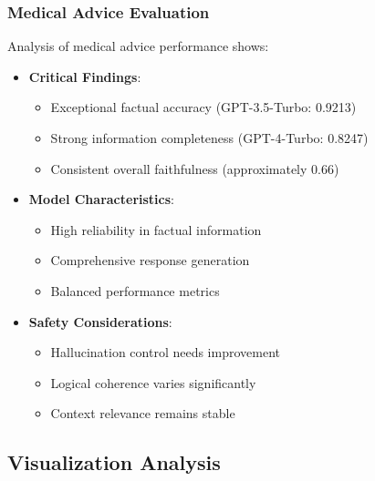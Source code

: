 \subsubsection{Medical Advice Evaluation}
Analysis of medical advice performance shows:
\begin{itemize}
    \item \textbf{Critical Findings}:
    \begin{itemize}
        \item Exceptional factual accuracy (GPT-3.5-Turbo: 0.9213)
        \item Strong information completeness (GPT-4-Turbo: 0.8247)
        \item Consistent overall faithfulness (approximately 0.66)
    \end{itemize}
    \item \textbf{Model Characteristics}:
    \begin{itemize}
        \item High reliability in factual information
        \item Comprehensive response generation
        \item Balanced performance metrics
    \end{itemize}
    \item \textbf{Safety Considerations}:
    \begin{itemize}
        \item Hallucination control needs improvement
        \item Logical coherence varies significantly
        \item Context relevance remains stable
    \end{itemize}
\end{itemize}

\subsection{Visualization Analysis}


